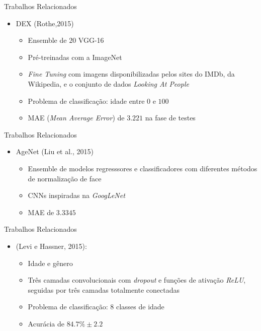 \begin{frame}{Trabalhos Relacionados}
\begin{itemize}
  \item \alert{DEX} (Rothe,2015)
  \begin{itemize}
    \item Ensemble de $20$ VGG-16
    \item Pré-treinadas com a ImageNet
    \item \emph{Fine Tuning} com imagens disponibilizadas pelos sites do IMDb, da Wikipedia, e o conjunto de dados \emph{Looking At People}
    \item Problema de classificação: idade entre $0$ e $100$
    \item MAE (\emph{Mean Average Error}) de $3.221$ na fase de testes
  \end{itemize}
  \end{itemize}
\end{frame}

\begin{frame}{Trabalhos Relacionados}
\begin{itemize}
  \item \alert{AgeNet} (Liu et al., 2015)
  \begin{itemize}
    \item Ensemble de modelos regresssores e classificadores com diferentes métodos de normalização de face
    \item CNNs inspiradas na \emph{GoogLeNet}
    \item MAE de $3.3345$
  \end{itemize}
\end{itemize}
\end{frame}

\begin{frame}{Trabalhos Relacionados}
\begin{itemize}
  \item (Levi e Hassner, 2015):
  \begin{itemize}
    \item Idade e gênero
    \item Três camadas convolucionais com \emph{dropout} e funções de ativação \emph{ReLU}, seguidas por três camadas totalmente conectadas
    \item Problema de classificação: 8 classes de idade
    \item Acurácia de $84.7\% \pm 2.2$
  \end{itemize}
\end{itemize}
\end{frame}
